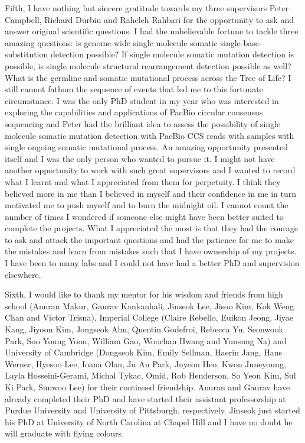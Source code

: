 \begin{acknowledgements}
Fifth, I have nothing but sincere gratitude towards my three supervisors Peter Campbell, Richard Durbin and Raheleh Rahbari for the opportunity to ask and answer original scientific questions. I had the unbelievable fortune to tackle three amazing questions: is genome-wide single molecule somatic single-base-substitution detection possible? If single molecule somatic mutation detection is possible, is single molecule structural rearrangement detection possible as well? What is the germline and somatic mutational process across the Tree of Life? I still cannot fathom the sequence of events that led me to this fortunate circumstance. I was the only PhD student in my year who was interested in exploring the capabilities and applications of PacBio circular consensus sequencing and Peter had the brilliant idea to assess the possibility of single molecule somatic mutation detection with PacBio CCS reads with samples with single ongoing somatic mutational process. An amazing opportunity presented itself and I was the only person who wanted to pursue it. I might not have another opportunity to work with such great supervisors and I wanted to record what I learnt and what I appreciated from them for perpetuity. I think they believed more in me than I believed in myself and their confidence in me in turn motivated me to push myself and to burn the midnight oil. I cannot count the number of times I wondered if someone else might have been better suited to complete the projects. What I appreciated the most is that they had the courage to ask and attack the important questions and had the patience for me to make the mistakes and learn from mistakes such that I have ownership of my projects. I have been to many labs and I could not have had a better PhD and supervision elsewhere. 

Sixth, I would like to thank my mentor  for his wisdom and friends from high school (Anuran Makur, Gaurav Kankanhali, Jinseok Lee, Jisoo Kim, Kok Weng Chan and Victor Trisna), Imperial College (Claire Rebello, Euikon Jeong,  Jiyae Kang, Jiyoon Kim, Jongseok Ahn, Quentin Godefroi, Rebecca Yu, Seonwook Park, Soo Young Yoon, William Gao, Woochan Hwang and Yunsung Na) and University of Cambridge (Dongseok Kim, Emily Sellman, Haerin Jang, Hans Werner, Hyesoo Lee, Ioana Olan, Ju An Park, Juyeon Heo, Kwon Juneyoung, Layla Hosseini-Gerami, Michal Tykac, Omid, Rob Henderson, So Yeon Kim, Sul Ki Park, Sunwoo Lee) for their continued friendship. Anuran and Gaurav have already completed their PhD and have started their assistant professorship at Purdue University and University of Pittsburgh, respectively. Jinseok just started his PhD at University of North Carolina at Chapel Hill and I have no doubt he will graduate with flying colours.  


\end{acknowledgements}
